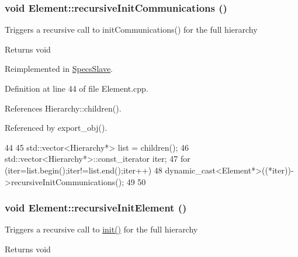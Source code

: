 \hypertarget{classElement_a82119ed37dff76508a2746a853ec35ba}{
\subsubsection[{recursiveInitCommunications}]{\setlength{\rightskip}{0pt plus 5cm}void Element::recursiveInitCommunications ()}}
\label{classElement_a82119ed37dff76508a2746a853ec35ba}
Triggers a recursive call to initCommunications() for the full hierarchy

\begin{DoxyReturn}{Returns}
void 
\end{DoxyReturn}


Reimplemented in \hyperlink{classSpecsSlave_a347b94c2ba660ccde6927fe72590a1bc}{SpecsSlave}.

Definition at line 44 of file Element.cpp.

References Hierarchy::children().

Referenced by export\_\-obj().


\begin{DoxyCode}
44                                          {
45   std::vector<Hierarchy*> list = children();
46   std::vector<Hierarchy*>::const_iterator iter;
47   for (iter=list.begin();iter!=list.end();iter++){
48     dynamic_cast<Element*>((*iter))->recursiveInitCommunications();
49   }
50 }
\end{DoxyCode}
\hypertarget{classElement_a3c0abcb36f8906688bb7e32608df7086}{
\subsubsection[{recursiveInitElement}]{\setlength{\rightskip}{0pt plus 5cm}void Element::recursiveInitElement ()}}
\label{classElement_a3c0abcb36f8906688bb7e32608df7086}
Triggers a recursive call to \hyperlink{classElement_af42754b5cabc198869222725218d695c}{init()} for the full hierarchy

\begin{DoxyReturn}{Returns}
void 
\end{DoxyReturn}



